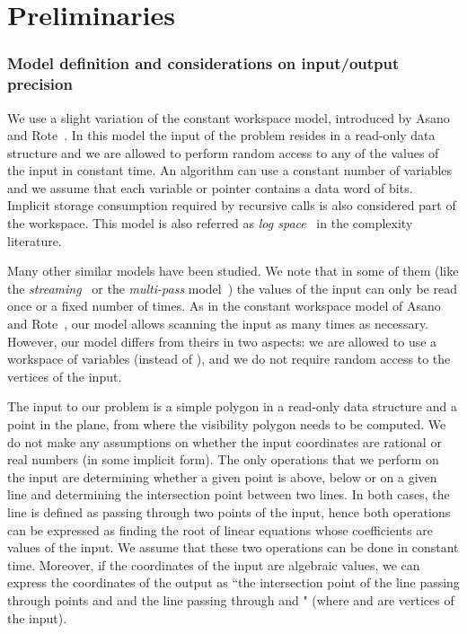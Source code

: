\documentclass[a4paper]{article}
\begin{document}
\section{Preliminaries}
\label{sec:Preliminaries}
\subsubsection*{Model definition and considerations on input/output precision}
We use a slight variation of the constant workspace model, introduced by Asano and Rote~\cite{ar-cwagp-09}. In this model the input of the problem resides in a read-only data structure and we are allowed to perform random access to any of the values of the input in constant time. 
An algorithm can use a constant number of variables and we assume that each variable or pointer contains a data word of  bits. 
Implicit storage consumption required by recursive calls is also considered part of the workspace. This model is also referred as {\em log space}~\cite{AB09} in the complexity literature.

Many other similar models have been studied. 
We note that in some of them (like the {\em streaming}~\cite{gk-seocqs-01} or the {\em multi-pass} model~\cite{cc-mpga-07}) the values of the input can only be read once or a fixed number of times. 
As in the constant workspace model of  Asano and Rote~\cite{ar-cwagp-09}, our model allows scanning the input as many times as necessary. 
However, our model differs from theirs in two aspects: we are allowed to use a workspace of  variables (instead of ), and we do not require random access to the vertices of the input. 

The input to our problem is a simple polygon  in a read-only data structure and a point  in the plane, from where the visibility polygon needs to be computed.
We do not make any assumptions on whether the input coordinates are rational or real numbers (in some implicit form). The only operations that we perform on the input are determining whether a given point is above, below or on a given line and determining the intersection point between two lines. In both cases, the line is defined as passing through two points of the input, hence both operations can be expressed as finding the root of linear equations whose coefficients are values of the input. We assume that these two operations can be done in constant time. Moreover, if the coordinates of the input are algebraic values, we can express the coordinates of the output as ``the intersection point of the line passing through points  and  and the line passing through  and " (where  and  are vertices of the input). 
\end{document}
